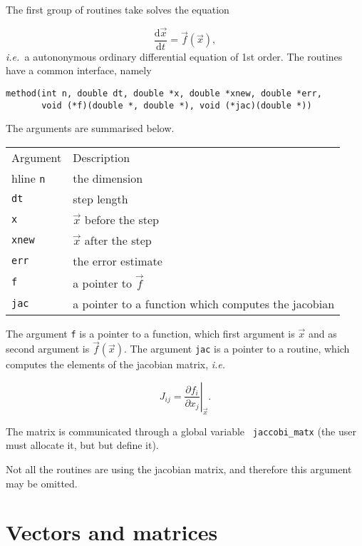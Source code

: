 \documentclass[12pt]{article}
\newcommand{\ie}[0]{{\it i.e.\ \/}}
\newcommand{\diff}[2]{\frac{{\mathrm d}#1}{{\mathrm d}#2}}
\begin{document}
The first group of routines take solves the equation

\begin{equation}
  \diff{\vec{x}}{t} = \vec{f}(\vec{x}),
  \label{ODEauto}
\end{equation}
\ie a autononymous ordinary differential equation of 1st order. The
routines have a common interface, namely

\begin{verbatim}
method(int n, double dt, double *x, double *xnew, double *err, 
       void (*f)(double *, double *), void (*jac)(double *))
\end{verbatim}

The arguments are summarised below.

\begin{center}
  \begin{tabular}{|l|l|}
    Argument    & Description \\ hline
    {\tt n}     & the dimension \\
    {\tt dt}    & step length \\
    {\tt x}     & $\vec{x}$ before the step \\
    {\tt xnew}  & $\vec{x}$ after the step \\
    {\tt err}   & the error estimate \\
    {\tt f}     & a pointer to $\vec{f}$ \\
    {\tt jac}   & a pointer to a function which computes the jacobian
    \\ 
    \hline
  \end{tabular}
\end{center}

The argument {\tt f} is a pointer to a function, which first argument
is $\vec{x}$ and as second argument is $\vec{f}(\vec{x})$. The
argument {\tt jac} is a pointer to a routine, which computes the
elements of the jacobian matrix, \ie

\begin{equation}
  J_{ij} = \left. \frac{\partial f_i}{\partial x_j}\right|_{\vec{x}}.
  \label{Jac}
\end{equation}

The matrix is communicated through a global variable {\tt
  jaccobi_matx} (the user must allocate it, but but define it).

Not all the routines are using the jacobian matrix, and therefore this
argument may be omitted.


\section{Vectors and matrices}
\label{sec:VecMatx}
\end{document}
